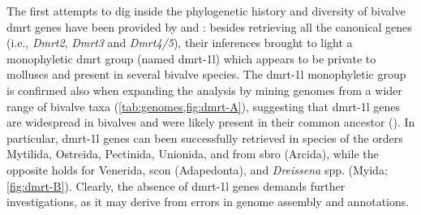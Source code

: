 The first attempts to dig inside the phylogenetic history and diversity of bivalve \gls{dmrt} genes have been provided by  and : besides retrieving all the canonical genes (i.e., \textit{Dmrt2}, \textit{Dmrt3} and \textit{Dmrt4/5}), their inferences brought to light a monophyletic \gls{dmrt} group (named \gls{dmrt-1l}) which appears to be private to molluscs and present in several bivalve species. The \gls{dmrt-1l} monophyletic group is confirmed also when expanding the analysis by mining genomes from a wider range of bivalve taxa (\cref{tab:genomes,fig:dmrt-A}), suggesting that \gls{dmrt-1l} genes are widespread in bivalves and were likely present in their common ancestor (). In particular, \gls{dmrt-1l} genes can been successfully retrieved in species of the orders Mytilida, Ostreida, Pectinida, Unionida, and from \gls{sbro} (Arcida), while the opposite holds for Venerida, \gls{scon} (Adapedonta), and \textit{Dreissena} spp. (Myida; \cref{fig:dmrt-B}). Clearly, the absence of \gls{dmrt-1l} genes demands further investigations, as it may derive from errors in genome assembly and annotations.

